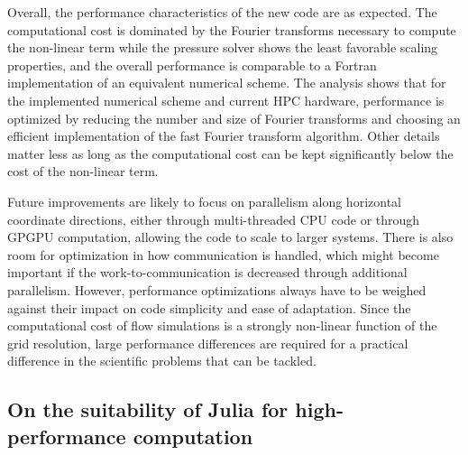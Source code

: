\documentclass[gmd, manuscript]{copernicus}
\begin{document}
Overall, the performance characteristics of the new code are as expected.
The computational cost is dominated by the Fourier transforms necessary to compute the non-linear term while the pressure solver shows the least favorable scaling properties, and the overall performance is comparable to a Fortran implementation of an equivalent numerical scheme.
The analysis shows that for the implemented numerical scheme and current HPC hardware, performance is optimized by reducing the number and size of Fourier transforms and choosing an efficient implementation of the fast Fourier transform algorithm.
Other details matter less as long as the computational cost can be kept significantly below the cost of the non-linear term.

Future improvements are likely to focus on parallelism along horizontal coordinate directions, either through multi-threaded CPU code or through GPGPU computation, allowing the code to scale to larger systems.
There is also room for optimization in how communication is handled, which might become important if the work-to-communication is decreased through additional parallelism.
However, performance optimizations always have to be weighed against their impact on code simplicity and ease of adaptation.
Since the computational cost of flow simulations is a strongly non-linear function of the grid resolution, large performance differences are required for a practical difference in the scientific problems that can be tackled.

\hypertarget{on-the-suitability-of-julia-for-high-performance-computation}{%
\subsection{On the suitability of Julia for high-performance computation}\label{on-the-suitability-of-julia-for-high-performance-computation}}
\end{document}
